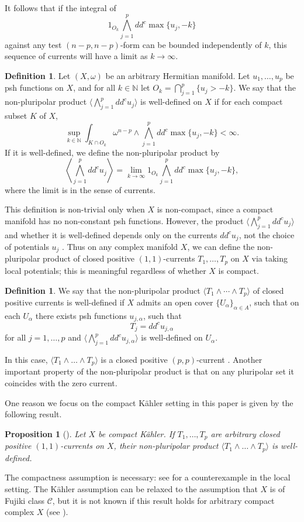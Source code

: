 \documentclass[a4paper]{amsart}
\newcommand{\N}{\mathbb{N}}
\newtheorem{prop}[theorem]{Proposition}
\theoremstyle{definition}
\newtheorem{definition}[theorem]{Definition}
\begin{document}
It follows that if the integral of \[1_{O_k}\bigwedge_{j=1}^p dd^c\max\{u_j, -k\}\] against any test $(n-p,n-p)$-form can be bounded independently of $k$, this sequence of currents will have a limit as $k\to\infty$.
\begin{definition}{\cite{BEGZ}} Let $(X, \omega)$ be an arbitrary Hermitian manifold. Let $u_1, \dots, u_p$ be psh functions on $X$, and for all $k\in \N$ let $O_k = \bigcap_{j=1}^p \{u_j > -k\}$. We say that the non-pluripolar product $\langle \bigwedge_{j=1}^p dd^c u_j\rangle$ is well-defined on $X$ if for each compact subset $K$ of $X$,
\[\sup_{k\in \N} \int_{K\cap O_k} \omega^{n-p} \wedge \bigwedge_{j=1}^p dd^c\max\{u_j, -k\} < \infty.\]
If it is well-defined, we define the non-pluripolar product by
\[\left< \bigwedge_{j=1}^p dd^c u_j\right> = \lim_{k\to\infty}1_{O_k}\bigwedge_{j=1}^p dd^c\max\{u_j, -k\},\]
where the limit is in the sense of currents.
\end{definition}
This definition is non-trivial only when $X$ is non-compact, since a compact manifold has no non-constant psh functions. However, the product $\langle\bigwedge_{j=1}^p dd^c u_j\rangle$ and whether it is well-defined depends only on the currents $dd^c u_j$, not the choice of potentials $u_j$ \cite[Proposition 1.4]{BEGZ}. Thus on any complex manifold $X$, we can define the non-pluripolar product of closed positive $(1, 1)$-currents $T_1, \dots, T_p$ on $X$ via taking local potentials; this is meaningful regardless of whether $X$ is compact.
\begin{definition}
We say that the non-pluripolar product $\langle T_1 \wedge \cdots \wedge T_p\rangle$ of closed positive currents is well-defined if $X$ admits an open cover $\{U_\alpha\}_{\alpha\in A}$, such that on each $U_\alpha$ there exists psh functions $u_{j,\alpha}$, such that \[T_j = dd^cu_{j, \alpha}\]
for all $j=1, \dots, p$ and $\langle \bigwedge_{j=1}^p dd^c u_{j, \alpha}\rangle$ is well-defined on $U_\alpha$.
\end{definition} In this case, $\langle T_1 \wedge \dots\wedge T_p\rangle$ is a closed positive $(p, p)$-current \cite[Theorem 1.8]{BEGZ}. Another important property of the non-pluripolar product is that on any pluripolar set it coincides with the zero current.

One reason we focus on the compact K\"ahler setting in this paper is given by the following result.
\begin{prop}[]
   Let $X$ be compact K\"ahler. If $T_1, \dots, T_p$ are arbitrary closed positive $(1, 1)$-currents on $X$, their non-pluripolar product $\langle T_1 \wedge \dots \wedge T_p\rangle$ is well-defined. 
\end{prop}
 The compactness assumption is necessary: see \cite[Example 1.3]{BEGZ} for a counterexample in the local setting. The K\"ahler assumption can be relaxed to the assumption that $X$ is of Fujiki class $\mathcal{C}$, but it is not known if this result holds for arbitrary compact complex $X$ (see \cite[Remark 1.7]{BEGZ}).
\end{document}

